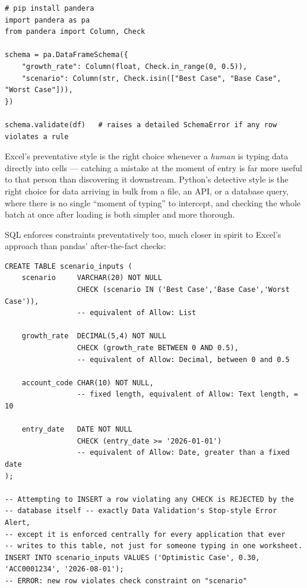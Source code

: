 \documentclass[11pt,a4paper]{article}
\begin{document}
\begin{lstlisting}[style=pythonstyle, caption={A schema-based library (pandera) makes the same detective checks more declarative and reusable}]
# pip install pandera
import pandera as pa
from pandera import Column, Check

schema = pa.DataFrameSchema({
    "growth_rate": Column(float, Check.in_range(0, 0.5)),
    "scenario": Column(str, Check.isin(["Best Case", "Base Case", "Worst Case"])),
})

schema.validate(df)   # raises a detailed SchemaError if any row violates a rule
\end{lstlisting}

\begin{protip}
Excel's preventative style is the right choice whenever a \emph{human} is typing data directly into cells --- catching a mistake at the moment of entry is far more useful to that person than discovering it downstream. Python's detective style is the right choice for data arriving in bulk from a file, an API, or a database query, where there is no single ``moment of typing'' to intercept, and checking the whole batch at once after loading is both simpler and more thorough.
\end{protip}

SQL enforces constraints preventatively too, much closer in spirit to Excel's approach than pandas' after-the-fact checks:

\begin{lstlisting}[style=sqlstyle, caption={SQL constraints -- the direct equivalents of each Data Validation type}]
CREATE TABLE scenario_inputs (
    scenario     VARCHAR(20) NOT NULL
                 CHECK (scenario IN ('Best Case','Base Case','Worst Case')),
                 -- equivalent of Allow: List

    growth_rate  DECIMAL(5,4) NOT NULL
                 CHECK (growth_rate BETWEEN 0 AND 0.5),
                 -- equivalent of Allow: Decimal, between 0 and 0.5

    account_code CHAR(10) NOT NULL,
                 -- fixed length, equivalent of Allow: Text length, = 10

    entry_date   DATE NOT NULL
                 CHECK (entry_date >= '2026-01-01')
                 -- equivalent of Allow: Date, greater than a fixed date
);

-- Attempting to INSERT a row violating any CHECK is REJECTED by the
-- database itself -- exactly Data Validation's Stop-style Error Alert,
-- except it is enforced centrally for every application that ever
-- writes to this table, not just for someone typing in one worksheet.
INSERT INTO scenario_inputs VALUES ('Optimistic Case', 0.30, 'ACC0001234', '2026-08-01');
-- ERROR: new row violates check constraint on "scenario"
\end{lstlisting}
\end{document}
